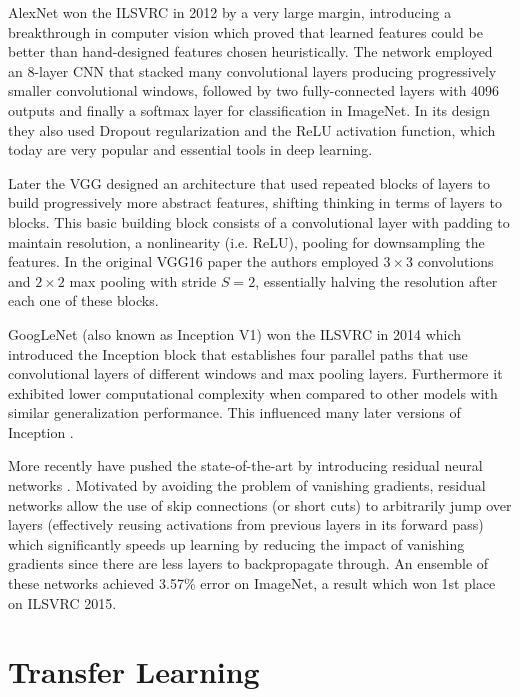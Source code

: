 AlexNet \cite{alexnet} won the \ac{ILSVRC} \cite{imagenet} in 2012 by a very large margin, introducing a breakthrough in computer vision which proved that learned features could be better than hand-designed features chosen heuristically. The network employed an 8-layer \ac{CNN} that stacked many convolutional layers producing progressively smaller convolutional windows, followed by two fully-connected layers with 4096 outputs and finally a softmax layer for classification in ImageNet. In its design they also used Dropout regularization and the ReLU activation function, which today are very popular and essential tools in deep learning.

Later the \ac{VGG} designed an architecture that used repeated blocks of layers to build progressively more abstract features, shifting thinking in terms of layers to blocks. This basic building block consists of a convolutional layer with padding to maintain resolution, a nonlinearity (i.e. ReLU), pooling for downsampling the features. In the original VGG16 paper \cite{vgg16} the authors employed $3 \times 3$ convolutions and $2 \times 2$ max pooling with stride $S = 2$, essentially halving the resolution after each one of these blocks.

GoogLeNet \cite{inceptionv1} (also known as Inception V1) won the \ac{ILSVRC} \cite{imagenet} in 2014 which introduced the Inception block that establishes four parallel paths that use convolutional layers of different windows and max pooling layers. Furthermore it exhibited lower computational complexity when compared to other models with similar generalization performance. This influenced many later versions of Inception \cite{inceptionv2_3}\cite{inceptionv4}.

More recently \citeauthor{resnet} have pushed the state-of-the-art by introducing residual neural networks \cite{resnet}. Motivated by avoiding the problem of vanishing gradients, residual networks allow the use of skip connections (or short cuts) to arbitrarily jump over layers (effectively reusing activations from previous layers in its forward pass) which significantly speeds up learning by reducing the impact of vanishing gradients since there are less layers to backpropagate through. An ensemble of these networks achieved 3.57\% error on ImageNet, a result which won 1st place on \ac{ILSVRC} 2015.

\section{Transfer Learning}
\label{section:transferlearning}

